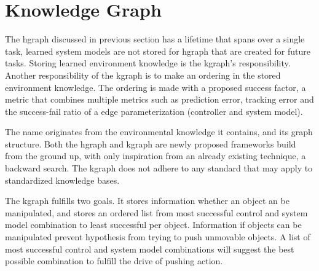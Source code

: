 \section{Knowledge Graph}%
\label{sec:kgraph}
The \ac{hgraph} discussed in previous section has a lifetime that spans over a single task, learned system models are not stored for \ac{hgraph} that are created for future tasks. Storing learned environment knowledge is the \ac{kgraph}'s responsibility. Another responsibility of the \ac{kgraph} is to make an ordering in the stored environment knowledge. The ordering is made with a proposed success factor, a metric that combines multiple metrics such as prediction error, tracking error and the success-fail ratio of a edge parameterization (controller and system model).\bs

The name  originates from the environmental knowledge it contains, and its graph structure. Both the \ac{hgraph} and \ac{kgraph} are newly proposed frameworks build from the ground up, with only inspiration from an already existing technique, a backward search. The \ac{kgraph} does not adhere to any standard that may apply to standardized knowledge bases.\bs





The \ac{kgraph} fulfills two goals. It stores information whether an object an be manipulated, and stores an ordered list from most successful control and system model combination to least successful per object. Information if objects can be manipulated prevent hypothesis from trying to push unmovable objects. A list of most successful control and system model combinations will suggest the best possible combination to fulfill the drive of pushing action.\bs

